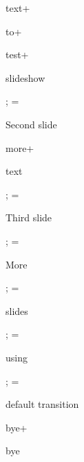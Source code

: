 text\pg+

to\pg+

test\pg+

slideshow

\pg;
\glet\bgcolor=\Green
\transition[Split:3:/Dm /V /M /I]

\sec Second slide

\transitions[Blinds:2]

more\pg+

text

\transitions[Wipe]

\pg;
\glet\bgcolor=\Brown
\transition[Dissolve]

\sec Third slide

\pg;
\glet\bgcolor=\Red
\transition[Box]

\sec More

\pg;
\glet\bgcolor=\Yellow

\sec slides

\pg;
\glet\bgcolor=\Red

\sec using

\pg;
\glet\bgcolor=\Yellow

\sec default transition

bye\pg+

bye

\bye
